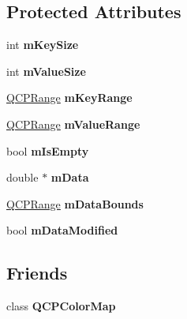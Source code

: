 \subsection*{Protected Attributes}
\begin{DoxyCompactItemize}
\item 
int {\bfseries m\+Key\+Size}\hypertarget{classQCPColorMapData_a354e06462023340fbc03894b22499f6d}{}\label{classQCPColorMapData_a354e06462023340fbc03894b22499f6d}

\item 
int {\bfseries m\+Value\+Size}\hypertarget{classQCPColorMapData_ae8ee9093632a59f55eb4fc06579ed256}{}\label{classQCPColorMapData_ae8ee9093632a59f55eb4fc06579ed256}

\item 
\hyperlink{classQCPRange}{Q\+C\+P\+Range} {\bfseries m\+Key\+Range}\hypertarget{classQCPColorMapData_aaaafd0d7d0f153dbd152f3daf34254ee}{}\label{classQCPColorMapData_aaaafd0d7d0f153dbd152f3daf34254ee}

\item 
\hyperlink{classQCPRange}{Q\+C\+P\+Range} {\bfseries m\+Value\+Range}\hypertarget{classQCPColorMapData_a225bb96f10c1a27b51ae59249477dbef}{}\label{classQCPColorMapData_a225bb96f10c1a27b51ae59249477dbef}

\item 
bool {\bfseries m\+Is\+Empty}\hypertarget{classQCPColorMapData_a10e91aa89ed05bd177b1f81e07b465b8}{}\label{classQCPColorMapData_a10e91aa89ed05bd177b1f81e07b465b8}

\item 
double $\ast$ {\bfseries m\+Data}\hypertarget{classQCPColorMapData_ac1682862022f575191351c9825187d39}{}\label{classQCPColorMapData_ac1682862022f575191351c9825187d39}

\item 
\hyperlink{classQCPRange}{Q\+C\+P\+Range} {\bfseries m\+Data\+Bounds}\hypertarget{classQCPColorMapData_a1798b3dcc0a27091d196bfd156dcb3f2}{}\label{classQCPColorMapData_a1798b3dcc0a27091d196bfd156dcb3f2}

\item 
bool {\bfseries m\+Data\+Modified}\hypertarget{classQCPColorMapData_ad3cc682da2ac14e5acdbc05cf4d3d93b}{}\label{classQCPColorMapData_ad3cc682da2ac14e5acdbc05cf4d3d93b}

\end{DoxyCompactItemize}
\subsection*{Friends}
\begin{DoxyCompactItemize}
\item 
class {\bfseries Q\+C\+P\+Color\+Map}\hypertarget{classQCPColorMapData_afa9d9eab63af3e6f20f882c8d7cc9f20}{}\label{classQCPColorMapData_afa9d9eab63af3e6f20f882c8d7cc9f20}

\end{DoxyCompactItemize}


